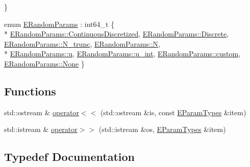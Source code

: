 \begin{DoxyCompactItemize}
 \}
\item 
enum \hyperlink{namespacesolar__core_a1a8e58483c0cf418bd680fc3a0ca8222}{E\+Random\+Params} \+: int64\+\_\+t \{ \\*
\hyperlink{namespacesolar__core_a1a8e58483c0cf418bd680fc3a0ca8222a75b2c3bf258ebd9b607f7535f0ca4005}{E\+Random\+Params\+::\+Continuous\+Discretized}, 
\hyperlink{namespacesolar__core_a1a8e58483c0cf418bd680fc3a0ca8222a4984667940802dedc139aa7a430a6553}{E\+Random\+Params\+::\+Discrete}, 
\hyperlink{namespacesolar__core_a1a8e58483c0cf418bd680fc3a0ca8222a84de419f0f66c134eb76a5d7513c8c6b}{E\+Random\+Params\+::\+N\+\_\+trunc}, 
\hyperlink{namespacesolar__core_a1a8e58483c0cf418bd680fc3a0ca8222a8d9c307cb7f3c4a32822a51922d1ceaa}{E\+Random\+Params\+::\+N}, 
\\*
\hyperlink{namespacesolar__core_a1a8e58483c0cf418bd680fc3a0ca8222a7b774effe4a349c6dd82ad4f4f21d34c}{E\+Random\+Params\+::u}, 
\hyperlink{namespacesolar__core_a1a8e58483c0cf418bd680fc3a0ca8222acc6e39cd4e6b0933050bad4144ee1ceb}{E\+Random\+Params\+::u\+\_\+int}, 
\hyperlink{namespacesolar__core_a1a8e58483c0cf418bd680fc3a0ca8222a8b9035807842a4e4dbe009f3f1478127}{E\+Random\+Params\+::custom}, 
\hyperlink{namespacesolar__core_a1a8e58483c0cf418bd680fc3a0ca8222a6adf97f83acf6453d4a6a4b1070f3754}{E\+Random\+Params\+::\+None}
 \}
\end{DoxyCompactItemize}
\subsection*{Functions}
\begin{DoxyCompactItemize}
\item 
std\+::ostream \& \hyperlink{namespacesolar__core_aa8fea9dac434e9830aad9dea4f5ebf53}{operator$<$$<$} (std\+::ostream \&is, const \hyperlink{namespacesolar__core_aa1147341e5ef7a40d68d1bd68e149362}{E\+Param\+Types} \&item)
\item 
std\+::istream \& \hyperlink{namespacesolar__core_a82ed442d50159b64b565838515df1dba}{operator$>$$>$} (std\+::istream \&os, \hyperlink{namespacesolar__core_aa1147341e5ef7a40d68d1bd68e149362}{E\+Param\+Types} \&item)
\end{DoxyCompactItemize}


\subsection{Typedef Documentation}
\hypertarget{namespacesolar__core_a256e8e2dc052f522b522d3f90b294caf}{}
